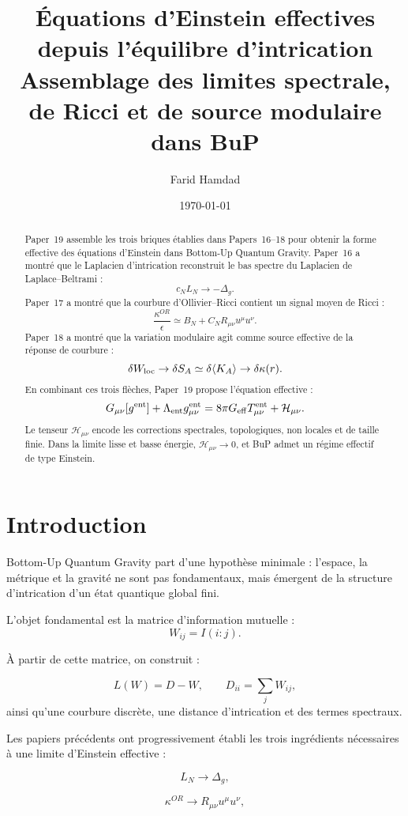 \documentclass[11pt,a4paper]{article}
\title{
\textbf{Équations d'Einstein effectives depuis l'équilibre d'intrication}\\
\large Assemblage des limites spectrale, de Ricci et de source modulaire dans BuP
}
\author{Farid Hamdad}
\date{\today}
\begin{document}
\maketitle

\begin{abstract}
Paper~19 assemble les trois briques établies dans Papers~16--18 pour obtenir
la forme effective des équations d'Einstein dans Bottom-Up Quantum Gravity.
Paper~16 a montré que le Laplacien d'intrication reconstruit le bas spectre
du Laplacien de Laplace--Beltrami :
\[
c_NL_N\to-\Delta_g.
\]
Paper~17 a montré que la courbure d'Ollivier--Ricci contient un signal moyen
de Ricci :
\[
\frac{\kappa^{OR}}{\epsilon}
\simeq
B_N+C_N R_{\mu\nu}u^\mu u^\nu.
\]
Paper~18 a montré que la variation modulaire agit comme source effective de
la réponse de courbure :
\[
\delta W_{\rm loc}
\to
\delta S_A
\simeq
\delta\langle K_A\rangle
\to
\delta\kappa(r).
\]
En combinant ces trois flèches, Paper~19 propose l'équation effective :
\[
G_{\mu\nu}[g^{\rm ent}]
+
\Lambda_{\rm ent}g_{\mu\nu}^{\rm ent}
=
8\pi G_{\rm eff}T_{\mu\nu}^{\rm ent}
+
\mathcal{H}_{\mu\nu}.
\]
Le tenseur \(\mathcal{H}_{\mu\nu}\) encode les corrections spectrales,
topologiques, non locales et de taille finie. Dans la limite lisse et basse
énergie, \(\mathcal{H}_{\mu\nu}\to0\), et BuP admet un régime effectif de type
Einstein.
\end{abstract}

\tableofcontents

\section{Introduction}

Bottom-Up Quantum Gravity part d'une hypothèse minimale : l'espace, la
métrique et la gravité ne sont pas fondamentaux, mais émergent de la structure
d'intrication d'un état quantique global fini.

L'objet fondamental est la matrice d'information mutuelle :
\[
W_{ij}=I(i:j).
\]

À partir de cette matrice, on construit :

\[
L(W)=D-W,
\qquad
D_{ii}=\sum_j W_{ij},
\]
ainsi qu'une courbure discrète, une distance d'intrication et des termes
spectraux.

Les papiers précédents ont progressivement établi les trois ingrédients
nécessaires à une limite d'Einstein effective :

\[
L_N\to\Delta_g,
\]

\[
\kappa^{OR}\to R_{\mu\nu}u^\mu u^\nu,
\]
\end{document}
